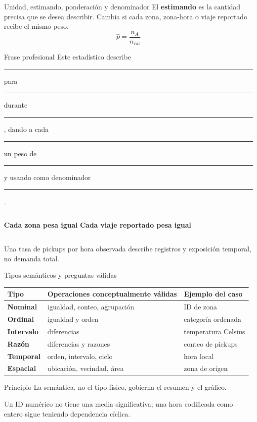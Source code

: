 \documentclass[aspectratio=169,11pt]{beamer}
\newcommand{\concepto}[1]{\textcolor{UAPTeal}{\textbf{#1}}}
\begin{document}
\begin{frame}{Unidad, estimando, ponderación y denominador}
  \small
  El \concepto{estimando} es la cantidad precisa que se desea describir. Cambia si cada zona, zona-hora o viaje reportado recibe el mismo peso.
  \[
    \widehat{p}=\frac{n_A}{n_{\mathrm{val}}}
  \]
  \begin{block}{Frase profesional}
    Este estadístico describe \rule{1.3cm}{.3pt} para \rule{1.3cm}{.3pt} durante \rule{1.3cm}{.3pt}, dando a cada \rule{1.3cm}{.3pt} un peso de \rule{1.1cm}{.3pt} y usando como denominador \rule{1.5cm}{.3pt}.
  \end{block}
  \begin{columns}[T]
    \centering\concepto{Cada zona pesa igual}
    \centering\concepto{Cada viaje reportado pesa igual}
  \end{columns}
  \vfill
  \centering Una tasa de pickups por hora observada describe registros y exposición temporal, no demanda total.
\end{frame}

\begin{frame}{Tipos semánticos y preguntas válidas}
  \footnotesize
  \begin{tabularx}{\textwidth}{>{\bfseries}p{} p{} X}
    \toprule
    Tipo & Operaciones conceptualmente válidas & Ejemplo del caso \\
    \midrule
    Nominal & igualdad, conteo, agrupación & ID de zona \\
    Ordinal & igualdad y orden & categoría ordenada \\
    Intervalo & diferencias & temperatura Celsius \\
    Razón & diferencias y razones & conteo de pickups \\
    Temporal & orden, intervalo, ciclo & hora local \\
    Espacial & ubicación, vecindad, área & zona de origen \\
    \bottomrule
  \end{tabularx}
  \vspace{.5em}
  \begin{block}{Principio}
    La semántica, no el tipo físico, gobierna el resumen y el gráfico.
  \end{block}
  Un ID numérico no tiene una media significativa; una hora codificada como entero sigue teniendo dependencia cíclica.
\end{frame}
\end{document}
